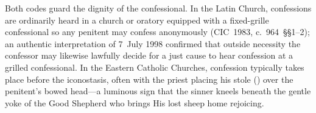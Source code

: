 Both codes guard the dignity of the confessional. In the Latin Church, confessions are ordinarily heard in a church or oratory equipped with a fixed-grille confessional so any penitent may confess anonymously (CIC~1983, c.~964~\S\S1--2); an authentic interpretation of 7~July 1998 confirmed that outside necessity the confessor may likewise lawfully decide for a just cause to hear confession at a grilled confessional. In the Eastern Catholic Churches, confession typically takes place before the iconostasis, often with the priest placing his stole () over the penitent's bowed head---a luminous sign that the sinner kneels beneath the gentle yoke of the Good Shepherd who brings His lost sheep home rejoicing.
